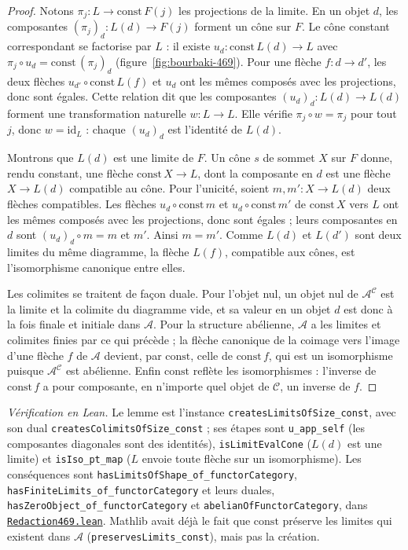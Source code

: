 \begin{proof}
Notons $\pi_j : L \to \mathrm{const}\, F(j)$ les projections de la limite. En un objet $d$, les composantes $(\pi_j)_d : L(d) \to F(j)$ forment un cône sur $F$. Le cône constant correspondant se factorise par $L$ : il existe $u_d : \mathrm{const}\, L(d) \to L$ avec $\pi_j \circ u_d = \mathrm{const}\,(\pi_j)_d$ (figure~\ref{fig:bourbaki-469}). Pour une flèche $f : d \to d'$, les deux flèches $u_{d'} \circ \mathrm{const}\, L(f)$ et $u_d$ ont les mêmes composés avec les projections, donc sont égales. Cette relation dit que les composantes $(u_d)_d : L(d) \to L(d)$ forment une transformation naturelle $w : L \to L$. Elle vérifie $\pi_j \circ w = \pi_j$ pour tout $j$, donc $w = \mathrm{id}_L$ : chaque $(u_d)_d$ est l'identité de $L(d)$.

Montrons que $L(d)$ est une limite de $F$. Un cône $s$ de sommet $X$ sur $F$ donne, rendu constant, une flèche $\mathrm{const}\, X \to L$, dont la composante en $d$ est une flèche $X \to L(d)$ compatible au cône. Pour l'unicité, soient $m, m' : X \to L(d)$ deux flèches compatibles. Les flèches $u_d \circ \mathrm{const}\, m$ et $u_d \circ \mathrm{const}\, m'$ de $\mathrm{const}\, X$ vers $L$ ont les mêmes composés avec les projections, donc sont égales ; leurs composantes en $d$ sont $(u_d)_d \circ m = m$ et $m'$. Ainsi $m = m'$. Comme $L(d)$ et $L(d')$ sont deux limites du même diagramme, la flèche $L(f)$, compatible aux cônes, est l'isomorphisme canonique entre elles.

Les colimites se traitent de façon duale. Pour l'objet nul, un objet nul de $\mathcal A^{\mathcal C}$ est la limite et la colimite du diagramme vide, et sa valeur en un objet $d$ est donc à la fois finale et initiale dans $\mathcal A$. Pour la structure abélienne, $\mathcal A$ a les limites et colimites finies par ce qui précède ; la flèche canonique de la coimage vers l'image d'une flèche $f$ de $\mathcal A$ devient, par $\mathrm{const}$, celle de $\mathrm{const}\, f$, qui est un isomorphisme puisque $\mathcal A^{\mathcal C}$ est abélienne. Enfin $\mathrm{const}$ reflète les isomorphismes : l'inverse de $\mathrm{const}\, f$ a pour composante, en n'importe quel objet de $\mathcal C$, un inverse de $f$.
\end{proof}

\noindent\emph{Vérification en Lean.} Le lemme est l'instance \texttt{createsLimitsOfSize\_const}, avec son dual \texttt{createsColimitsOfSize\_const} ; ses étapes sont \texttt{u\_app\_self} (les composantes diagonales sont des identités), \texttt{isLimitEvalCone} ($L(d)$ est une limite) et \texttt{isIso\_pt\_map} ($L$ envoie toute flèche sur un isomorphisme). Les conséquences sont \texttt{hasLimitsOfShape\_of\_functorCategory}, \texttt{hasFiniteLimits\_of\_functorCategory} et leurs duales, \texttt{hasZeroObject\_of\_functorCategory} et \texttt{abelianOfFunctorCategory}, dans \href{\leanblobmain/Redaction469.lean}{\texttt{Redaction469.\allowbreak{}lean}}. Mathlib avait déjà le fait que $\mathrm{const}$ préserve les limites qui existent dans $\mathcal A$ (\texttt{preservesLimits\_const}), mais pas la création.

